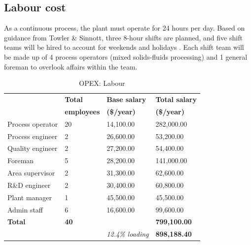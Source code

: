 \subsection{Labour cost}
As a continuous process, the plant must operate for 24 hours per day. Based on guidance from Towler \& Sinnott, three 8-hour shifts are planned, and five shift teams will be hired to account for weekends and holidays \cite{sinnott_chemical_2020}. Each shift team will be made up of 4 process operators (mixed solids-fluids processing) and 1 general foreman to overlook affairs within the team. 

    \begin{table}
    \centering
    \caption{OPEX: Labour}
    \label{tab:opex-labour}
    \begin{tabular}{@{}llll@{}}
    \toprule
    \textbf{}        & \textbf{Total} & \textbf{Base salary}              & \textbf{Total salary} \\
    \textbf{}        & \textbf{employees} & \textbf{(\$/year)}              & \textbf{(\$/year)} \\\midrule
    Process operator & 20                       & 14,100.00                                   & 282,000.00                      \\
    Process engineer & 2                        & 26,600.00                                   & 53,200.00                       \\
    Quality engineer & 2                        & 27,200.00                                   & 54,400.00                       \\
    Foreman          & 5                        & 28,200.00                                   & 141,000.00                      \\
    Area supervisor  & 2                        & 31,300.00                                   & 62,600.00                       \\
    R\&D engineer    & 2                        & 30,400.00                                   & 60,800.00                       \\
    Plant manager    & 1                        & 45,500.00                                   & 45,500.00                       \\
    Admin staff      & 6                        & 16,600.00                                   & 99,600.00                       \\
    \textbf{Total}   & \textbf{40}              & \textbf{}                                   & \textbf{799,100.00}             \\
                     &                          & \multicolumn{1}{r}{\textit{12.4\% loading}} & \textbf{898,188.40} \\\bottomrule           
    \end{tabular}
    \end{table}

